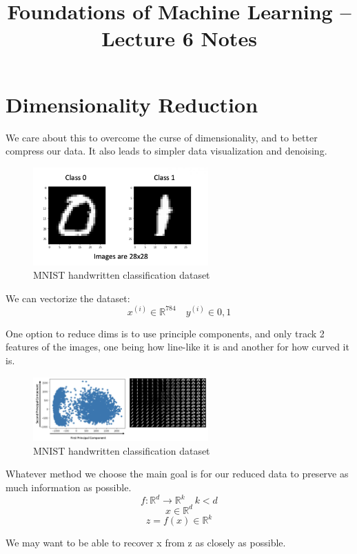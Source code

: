 \documentclass[11pt]{article}
\title{Foundations of Machine Learning -- Lecture 6 Notes}
\author{}
\date{}
\begin{document}
\maketitle

\section*{Dimensionality Reduction}
We care about this to overcome the curse of dimensionality, and to better compress our data.
It also leads to simpler data visualization and denoising.

\begin{figure}[h!]
	\centering
	\includegraphics[width=0.6\textwidth]{../imgs/MNIST.png}
	\caption{MNIST handwritten classification dataset}
\end{figure}

We can vectorize the dataset:
\[
	x^{(i)} \in \mathbb{R}^{784}
	\quad
	y^{(i)} \in {0,1}
\]

One option to reduce dims is to use principle components, and only track 2 features of the images, one being how line-like it is and another for how curved it is.

\begin{figure}[h!]
	\centering
	\includegraphics[width=0.6\textwidth]{../imgs/pcomps.png}
	\caption{MNIST handwritten classification dataset}
\end{figure}

\pagebreak

Whatever method we choose the main goal is for our reduced data to preserve as much information as possible.
\[
	f: \mathbb{R}^d \rightarrow \mathbb{R}^k \quad k<d
\]
\[
	x \in \mathbb{R}^d
\]
\[
	z = f(x) \in \mathbb{R}^k
\]

We may want to be able to recover x from z as closely as possible.
\end{document}
